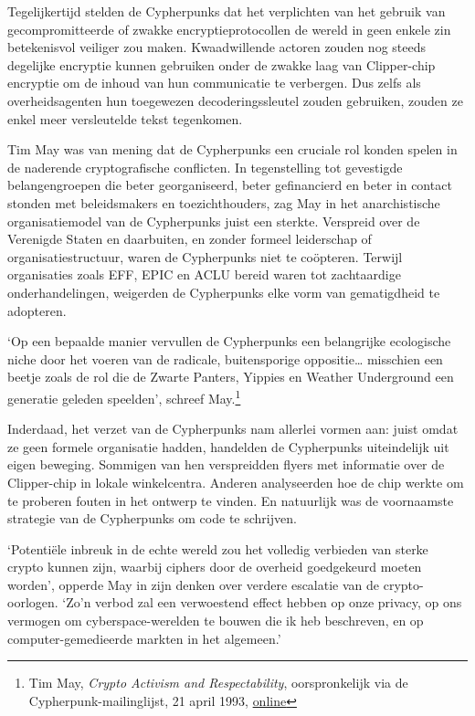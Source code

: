 \documentclass[
  a5paper,
  smalldemyvopaper,11pt,twoside,onecolumn,openright,extrafontsizes,
hidelinks]{memoir}
\begin{document}
Tegelijkertijd stelden de Cypherpunks dat het verplichten van het
gebruik van gecompromitteerde of zwakke encryptieprotocollen de wereld
in geen enkele zin betekenisvol veiliger zou maken. Kwaadwillende
actoren zouden nog steeds degelijke encryptie kunnen gebruiken onder de
zwakke laag van Clipper-chip encryptie om de inhoud van hun communicatie
te verbergen. Dus zelfs als overheidsagenten hun toegewezen
decoderingssleutel zouden gebruiken, zouden ze enkel meer versleutelde
tekst tegenkomen.

Tim May was van mening dat de Cypherpunks een cruciale rol konden spelen
in de naderende cryptografische conflicten. In tegenstelling tot
gevestigde belangengroepen die beter georganiseerd, beter gefinancierd
en beter in contact stonden met beleidsmakers en toezichthouders, zag
May in het anarchistische organisatiemodel van de Cypherpunks juist een
sterkte. Verspreid over de Verenigde Staten en daarbuiten, en zonder
formeel leiderschap of organisatiestructuur, waren de Cypherpunks niet
te coöpteren. Terwijl organisaties zoals EFF, EPIC en ACLU bereid waren
tot zachtaardige onderhandelingen, weigerden de Cypherpunks elke vorm
van gematigdheid te adopteren.

`Op een bepaalde manier vervullen de Cypherpunks een belangrijke
ecologische niche door het voeren van de radicale, buitensporige
oppositie\ldots{} misschien een beetje zoals de rol die de Zwarte
Panters, Yippies en Weather Underground een generatie geleden speelden',
schreef May.\footnote{Tim May, \emph{Crypto Activism and
  Respectability}, oorspronkelijk via de Cypherpunk-mailinglijst, 21
  april 1993,
  \href{https://cypherpunks.venona.com/date/1993/04/msg00400.html}{online}}

Inderdaad, het verzet van de Cypherpunks nam allerlei vormen aan: juist
omdat ze geen formele organisatie hadden, handelden de Cypherpunks
uiteindelijk uit eigen beweging. Sommigen van hen verspreidden flyers
met informatie over de Clipper-chip in lokale winkelcentra. Anderen
analyseerden hoe de chip werkte om te proberen fouten in het ontwerp te
vinden. En natuurlijk was de voornaamste strategie van de Cypherpunks om
code te schrijven.

`Potentiële inbreuk in de echte wereld zou het volledig verbieden van
sterke crypto kunnen zijn, waarbij ciphers door de overheid goedgekeurd
moeten worden', opperde May in zijn denken over verdere escalatie van de
crypto-oorlogen. `Zo'n verbod zal een verwoestend effect hebben op onze
privacy, op ons vermogen om cyberspace-werelden te bouwen die ik heb
beschreven, en op computer-gemedieerde markten in het algemeen.'
\end{document}

